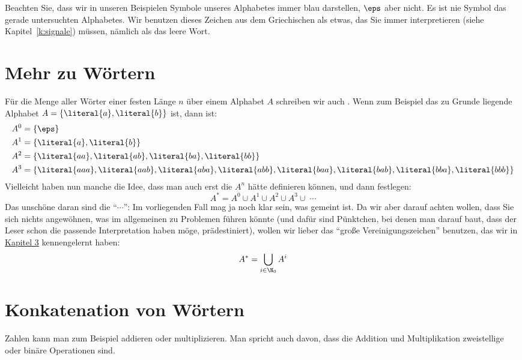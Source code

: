 Beachten Sie, dass wir in unseren Beispielen Symbole unseres
Alphabetes immer blau darstellen, $\eps$ aber nicht. Es ist nie Symbol
das gerade untersuchten Alphabetes. Wir benutzen dieses Zeichen aus
dem Griechischen als etwas, das Sie immer interpretieren (siehe
Kapitel~\ref{k:signale}) müssen, nämlich als das leere Wort.

\Tut\section{Mehr zu W\"ortern}

Für die Menge aller Wörter einer festen Länge $n$ über einem Alphabet
$A$ schreiben wir auch . Wenn
zum Beispiel das zu Grunde liegende Alphabet $A=\{\literal{a},
\literal{b}\}$ ist, dann ist:
%
\begin{align*}
  A^0 & =\{\eps \} \\
  A^1 & =\{\literal{a}, \literal{b} \} \\
  A^2 & =\{\literal{aa}, \literal{ab}, \literal{ba}, \literal{bb} \} \\
  A^3 & =\{\literal{aaa}, \literal{aab}, \literal{aba}, \literal{abb}, \literal{baa},
  \literal{bab}, \literal{bba}, \literal{bbb} \} \\
\end{align*}
%
Vielleicht haben nun manche die Idee, dass man auch erst die $A^n$ hätte
definieren können, und dann festlegen:
%
\[
A^* = A^0 \cup A^1 \cup A^2 \cup A^3 \cup \; \cdots
\]
%
Das unschöne daran sind die "`$\cdots$"': Im vorliegenden Fall mag ja
noch klar sein, was gemeint ist. Da wir aber darauf achten wollen,
dass Sie sich nichts angewöhnen, was im allgemeinen zu Problemen
führen könnte (und dafür sind Pünktchen, bei denen man darauf baut,
dass der Leser schon die passende Interpretation haben möge,
prädestiniert), wollen wir lieber das "`große Vereinigungszeichen"'
benutzen, das wir in \hyperref[k:alphabete-wort]{Kapitel 3}
kennengelernt haben:
%
\[
A^* = \bigcup_{i\in\N_0} A^i
\]
%
\Tut\section{Konkatenation von W\"ortern}

Zahlen kann man zum Beispiel addieren oder multiplizieren. Man spricht
auch davon, dass die Addition und Multiplikation zweistellige oder
binäre Operationen sind.

